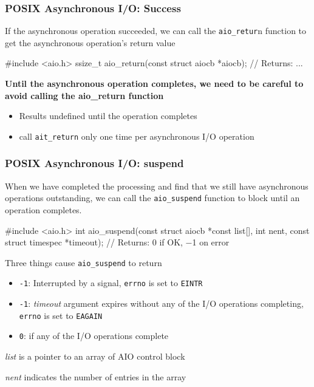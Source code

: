 \documentclass[newPxFont,sthlmFooter,nooffset]{beamer}
\begin{document}
\begin{frame}[t, fragile]
  \frametitle{POSIX Asynchronous I/O: Success}
If the asynchronous operation succeeded, we can call the \texttt{aio\_retur}n function to get the asynchronous operation’s return value
\begin{codedef}
#include <aio.h>
ssize_t aio_return(const struct aiocb *aiocb);
// Returns: ...
\end{codedef}
\textbf{Until the asynchronous operation completes, we need to be careful to avoid calling the aio\_return function}
\begin{itemize}
\item Results undefined until the operation completes
\item call \texttt{ait\_return} only one time per asynchronous I/O operation
\end{itemize}
\end{frame}


\begin{frame}[t, fragile]
  \frametitle{POSIX Asynchronous I/O: suspend}

When we have completed the processing and find that we still have asynchronous operations outstanding,
we can call the \texttt{aio\_suspend} function to block until an operation completes.

\begin{codedef}
#include <aio.h>
int aio_suspend(const struct aiocb *const list[], int nent,
                const struct timespec *timeout);
// Returns: 0 if OK, −1 on error
\end{codedef}

Three things cause \texttt{aio\_suspend} to return
{\footnotesize
\begin{itemize}
  \item \texttt{-1}: Interrupted by a signal, \texttt{errno} is set to
    \texttt{EINTR}
  \item \texttt{-1}: \textit{timeout} argument expires without any of the I/O operations completing, \texttt{errno} is set to \texttt{EAGAIN}
\item \texttt{0}: if any of the I/O operations complete
\end{itemize}
}
\textit{list}  is a pointer to an array of AIO control block

\textit{nent} indicates the number of entries in the array
\end{frame}
\end{document}
